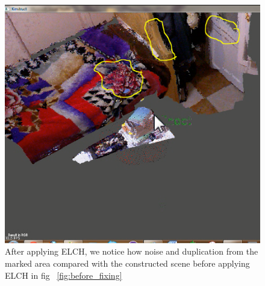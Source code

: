 \begin{figure}[H]
\centering
\includegraphics{Loop/after_fixing.png}
\caption{After applying ELCH, we notice how noise and duplication from the marked area compared with the constructed scene before applying ELCH in fig ~\ref{fig:before_fixing} }
\label{fig:after_fixing}
\end{figure}
